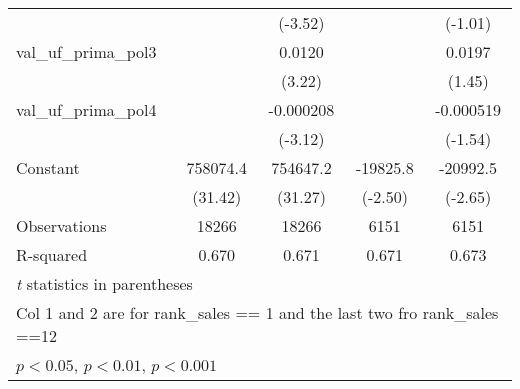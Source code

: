 {\begin{tabular}{l*{4}{c}}
                    &                     &     (-3.52)         &                     &     (-1.01)         \\
val\_uf\_prima\_pol3   &                     &      0.0120\sym{**} &                     &      0.0197         \\
                    &                     &      (3.22)         &                     &      (1.45)         \\
val\_uf\_prima\_pol4   &                     &   -0.000208\sym{**} &                     &   -0.000519         \\
                    &                     &     (-3.12)         &                     &     (-1.54)         \\
Constant            &    758074.4\sym{***}&    754647.2\sym{***}&    -19825.8\sym{*}  &    -20992.5\sym{**} \\
                    &     (31.42)         &     (31.27)         &     (-2.50)         &     (-2.65)         \\
\hline
Observations        &       18266         &       18266         &        6151         &        6151         \\
R-squared           &       0.670         &       0.671         &       0.671         &       0.673         \\
\hline\hline
\multicolumn{5}{l}{\footnotesize \textit{t} statistics in parentheses}\\
\multicolumn{5}{l}{\footnotesize Col 1 and 2 are for rank\_sales == 1 and the last two fro rank\_sales ==12 }\\
\multicolumn{5}{l}{\footnotesize \sym{*} \(p<0.05\), \sym{**} \(p<0.01\), \sym{***} \(p<0.001\)}\\
\end{tabular}
}
